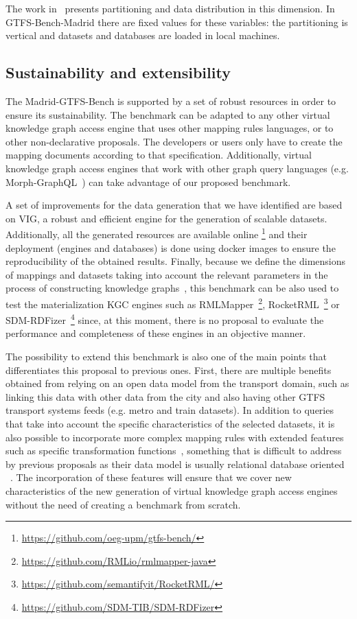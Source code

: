 The work in~\citep{montoya2012benchmarking} presents partitioning and data distribution in this dimension. In GTFS-Bench-Madrid there are fixed values for these variables: the partitioning is vertical and datasets and databases are loaded in local machines.

\subsection{Sustainability and extensibility}
The Madrid-GTFS-Bench is supported by a set of robust resources in order to ensure its sustainability. The benchmark can be adapted to any other virtual knowledge graph access engine that uses other mapping rules languages, or to other non-declarative proposals. The developers or users only have to create the mapping documents according to that specification. Additionally, virtual knowledge graph access engines that work with other graph query languages (e.g. Morph-GraphQL~\citep{priyatna2019morph}) can take advantage of our proposed benchmark. 

A set of improvements for the data generation that we have identified are based on VIG, a robust and efficient engine for the generation of scalable datasets. Additionally, all the generated resources are available online \footnote{\url{https://github.com/oeg-upm/gtfs-bench/}} and their deployment (engines and databases) is done using docker images to ensure the reproducibility of the obtained results. Finally, because we define the dimensions of mappings and datasets taking into account the relevant parameters in the process of constructing knowledge graphs~\citep{chaves2019what}, this benchmark can be also used to test the materialization KGC engines such as RMLMapper~\footnote{\url{https://github.com/RMLio/rmlmapper-java}}, RocketRML~\footnote{\url{https://github.com/semantifyit/RocketRML/}} or SDM-RDFizer~\footnote{\url{https://github.com/SDM-TIB/SDM-RDFizer}} since, at this moment, there is no proposal to evaluate the performance and completeness of these engines in an objective manner.

The possibility to extend this benchmark is also one of the main points that differentiates this proposal to previous ones. First, there are multiple benefits obtained from relying on an open data model from the transport domain, such as linking this data with other data from the city and also having other GTFS transport systems feeds (e.g. metro and train datasets). In addition to queries that take into account the specific characteristics of the selected datasets, it is also possible to incorporate more complex mapping rules with extended features such as specific transformation functions~\citep{de2016ontology}, something that is difficult to address by previous proposals as their data model is usually relational database oriented ~\citep{bizer2009berlin,lanti2015npd}. The incorporation of these features will ensure that we cover new characteristics of the new generation of virtual knowledge graph access engines without the need of creating a benchmark from scratch.  


